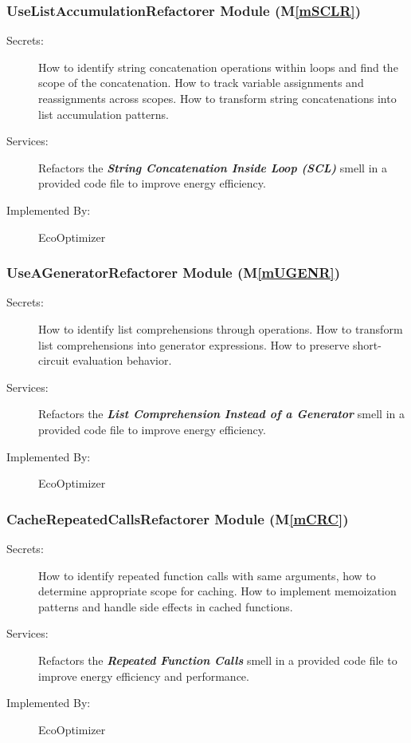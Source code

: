 \documentclass[12pt, titlepage]{article}
\newcommand{\mref}[1]{M\ref{#1}}
\begin{document}
\subsubsection{UseListAccumulationRefactorer Module (\mref{mSCLR})}


\begin{description}
\item[Secrets:] How to identify string concatenation operations within loops and find the scope of the concatenation. How to track variable assignments and reassignments across scopes. How to transform string concatenations into list accumulation patterns.
\item[Services:] Refactors the \textbf{\textit{String Concatenation Inside Loop (SCL)}} smell in a provided code file to improve energy efficiency.
\item[Implemented By:] EcoOptimizer
\end{description}

\subsubsection{UseAGeneratorRefactorer Module (\mref{mUGENR})}
\begin{description}
    \item[Secrets:] How to identify list comprehensions through operations. How to transform list comprehensions into generator expressions. How to preserve short-circuit evaluation behavior.
    \item[Services:] Refactors the \textbf{\textit{List Comprehension Instead of a Generator}} smell in a provided code file to improve energy efficiency.
    \item[Implemented By:] EcoOptimizer
\end{description}

\subsubsection{CacheRepeatedCallsRefactorer Module (\mref{mCRC})}
\begin{description}
    \item[Secrets:] How to identify repeated function calls with same arguments, how to determine appropriate scope for caching. How to implement memoization patterns and handle side effects in cached functions.
    \item[Services:] Refactors the \textbf{\textit{Repeated Function Calls}} smell in a provided code file to improve energy efficiency and performance.
    \item[Implemented By:] EcoOptimizer
\end{description}
\end{document}

